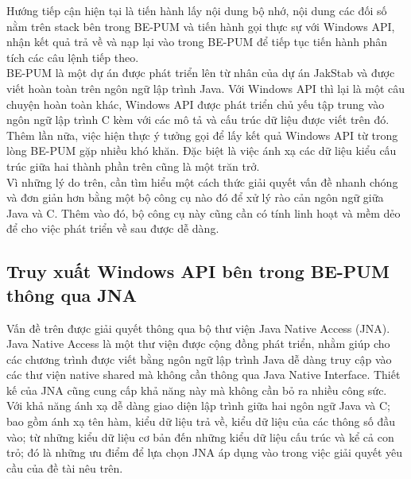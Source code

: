 Hướng tiếp cận hiện tại là tiến hành lấy nội dung bộ nhớ, nội dung các đối số nằm trên stack bên trong BE-PUM và tiến hành gọi thực sự với Windows API, nhận kết quả trả về và nạp lại vào trong BE-PUM để tiếp tục tiến hành phân tích các câu lệnh tiếp theo.\\

BE-PUM là một dự án được phát triển lên từ nhân của dự án JakStab và được viết hoàn toàn trên ngôn ngữ lập trình Java. Với Windows API thì lại là một câu chuyện hoàn toàn khác, Windows API được phát triển chủ yếu tập trung vào ngôn ngữ lập trình C kèm với các mô tả và cấu trúc dữ liệu được viết trên đó. Thêm lần nữa, việc hiện thực ý tưởng gọi để lấy kết quả Windows API từ trong lòng BE-PUM gặp nhiều khó khăn. Đặc biệt là việc ánh xạ các dữ liệu kiểu cấu trúc giữa hai thành phần trên cũng là một trăn trở.\\

Vì những lý do trên, cần tìm hiểu một cách thức giải quyết vấn đề nhanh chóng và đơn giản hơn bằng một bộ công cụ nào đó để xử lý rào cản ngôn ngữ giữa Java và C. Thêm vào đó, bộ công cụ này cũng cần có tính linh hoạt và mềm dẻo để cho việc phát triển về sau được dễ dàng.\\




	\subsection{Truy xuất Windows API bên trong BE-PUM thông qua JNA}

Vấn đề trên được giải quyết thông qua bộ thư viện Java Native Access (JNA).\\

Java Native Access là một thư viện được cộng đồng phát triển, nhằm giúp cho các chương trình được viết bằng ngôn ngữ lập trình Java dễ dàng truy cập vào các thư viện native shared mà không cần thông qua Java Native Interface. Thiết kế của JNA cũng cung cấp khả năng này mà không cần bỏ ra nhiều công sức.\\

Với khả năng ánh xạ dễ dàng giao diện lập trình giữa hai ngôn ngữ Java và C; bao gồm ánh xạ tên hàm, kiểu dữ liệu trả về, kiểu dữ liệu của các thông số đầu vào; từ những kiểu dữ liệu cơ bản đến những kiểu dữ liệu cấu trúc và kể cả con trỏ; đó là những ưu điểm để lựa chọn JNA áp dụng vào trong việc giải quyết yêu cầu của đề tài nêu trên.